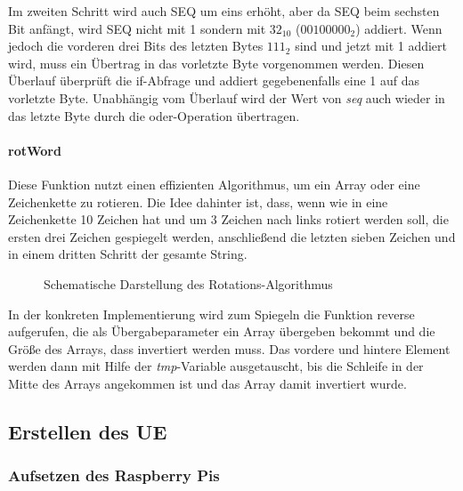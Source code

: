 		Im zweiten Schritt wird auch SEQ um eins erhöht, aber da SEQ beim sechsten Bit anfängt, wird SEQ nicht mit
		1 sondern mit $32_{10}$ ($00100000_2$) addiert. Wenn jedoch die vorderen drei Bits des letzten Bytes $111_2$ sind
		und jetzt mit 1 addiert wird, muss ein Übertrag in das vorletzte Byte vorgenommen werden. Diesen Überlauf
		überprüft die if-Abfrage und addiert gegebenenfalls eine 1 auf das vorletzte Byte. Unabhängig vom Überlauf wird
		der Wert von \emph{seq} auch wieder in das letzte Byte durch die oder-Operation übertragen.

        \clearpage
		\paragraph{rotWord}
		Diese Funktion nutzt einen effizienten Algorithmus, um ein Array oder eine Zeichenkette zu rotieren. Die
		Idee dahinter ist, dass, wenn wie in  eine Zeichenkette 10 Zeichen hat und um 3 Zeichen
		nach links rotiert werden soll, die ersten drei Zeichen gespiegelt werden, anschließend die letzten
		sieben Zeichen und in einem dritten Schritt der gesamte String.

		\begin{figure}[htp]
			\begin{center}
			\end{center}
			\caption{Schematische Darstellung des Rotations-Algorithmus}
			\label{fig:rotWord}
		\end{figure}
		
		In der konkreten Implementierung wird zum Spiegeln die Funktion reverse aufgerufen, die als
		Übergabeparameter ein Array übergeben bekommt und die Größe des Arrays, dass invertiert werden muss.
		Das vordere und hintere Element werden dann mit Hilfe der \emph{tmp}-Variable ausgetauscht, bis die Schleife
		in der Mitte des Arrays angekommen ist und das Array damit invertiert wurde.

	\clearpage
	
	\subsection[Erstellen des UE (Schenkel)]{Erstellen des UE}
		\subsubsection[Aufsetzen des Raspberry Pis (Schenkel)]{Aufsetzen des Raspberry Pis}
        \label{subsubsec:installpi}
